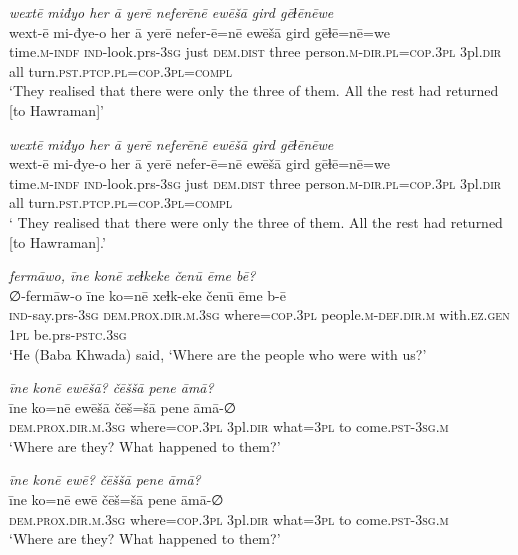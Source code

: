 \ea \label{BP.107}
\textit{wextē miđyo her ā yerē neferēnē ewēšā gird gēɫēnēwe} \\ 
\gll wext-ē mi-đye-o her ā yerē nefer-ē=nē ewēšā gird gēɫē=nē=we \\ 
 time\textsc{.m}\textsc{-indf} \textsc{ind-}look.prs\textsc{-3sg} just \textsc{dem.dist} three person\textsc{.m}\textsc{-dir}\textsc{.pl}\textsc{=cop}\textsc{.3pl} 3pl\textsc{.dir} all turn\textsc{.pst}\textsc{.ptcp}\textsc{.pl}\textsc{=cop}\textsc{.3pl}\textsc{=compl} \\ 
\glt `They realised that there were only the three of them. All the rest had returned [to Hawraman]'
\z 
 
\ea \label{BP.108}
\textit{wextē miđyo her ā yerē neferēnē ewēšā gird gēɫēnēwe} \\ 
\gll wext-ē mi-đye-o her ā yerē nefer-ē=nē ewēšā gird gēɫē=nē=we \\ 
 time\textsc{.m}\textsc{-indf} \textsc{ind-}look.prs\textsc{-3sg} just \textsc{dem.dist} three person\textsc{.m}\textsc{-dir}\textsc{.pl}\textsc{=cop}\textsc{.3pl} 3pl\textsc{.dir} all turn\textsc{.pst}\textsc{.ptcp}\textsc{.pl}\textsc{=cop}\textsc{.3pl}\textsc{=compl} \\ 
\glt ` They realised that there were only the three of them. All the rest had returned [to Hawraman].'
\z 
 
\ea \label{BP.109}
\textit{fermāwo, īne konē xeɫkeke čenū ēme bē?} \\ 
\gll ∅-fermāw-o īne ko=nē xeɫk-eke čenū ēme b-ē \\ 
 \textsc{ind-}say.prs\textsc{-3sg} \textsc{dem.prox}\textsc{.dir}\textsc{.m}\textsc{.3sg} where\textsc{=cop}\textsc{.3pl} people\textsc{.m}\textsc{-def}\textsc{.dir}\textsc{.m} with\textsc{.ez.gen} \textsc{1pl} be.prs\textsc{-pstc}\textsc{.3sg} \\ 
\glt `He (Baba Khwada) said, ‘Where are the people who were with us?'
\z 
 
\ea \label{BP.111}
\textit{īne konē ewēšā? čēššā pene āmā?} \\ 
\gll īne ko=nē ewēšā čēš=šā pene āmā-∅ \\ 
 \textsc{dem.prox}\textsc{.dir}\textsc{.m}\textsc{.3sg} where\textsc{=cop}\textsc{.3pl} 3pl\textsc{.dir} what\textsc{=3pl} to come\textsc{.pst}\textsc{-3sg}\textsc{.m} \\ 
\glt `Where are they? What happened to them?'
\z 
 
\ea \label{BP.112}
\textit{īne konē ewē? čēššā pene āmā?} \\ 
\gll īne ko=nē ewē čēš=šā pene āmā-∅ \\ 
 \textsc{dem.prox}\textsc{.dir}\textsc{.m}\textsc{.3sg} where\textsc{=cop}\textsc{.3pl} 3pl\textsc{.dir} what\textsc{=3pl} to come\textsc{.pst}\textsc{-3sg}\textsc{.m} \\ 
\glt `Where are they? What happened to them?'
\z 
 
